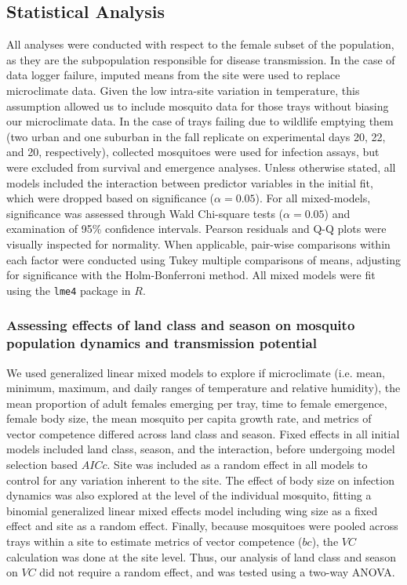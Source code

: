 \documentclass[12pt]{article}
\begin{document}
\subsection{Statistical Analysis}

All analyses were conducted with respect to the female subset of the population, as they are the subpopulation responsible for disease transmission. In the case of data logger failure, imputed means from the site were used to replace microclimate data. Given the low intra-site variation in temperature, this assumption allowed us to include mosquito data for those trays without biasing our microclimate data. In the case of trays failing due to wildlife emptying them (two urban and one suburban in the fall replicate on experimental days 20, 22, and 20, respectively), collected mosquitoes were used for infection assays, but were excluded from survival and emergence analyses. Unless otherwise stated, all models included the interaction between predictor variables in the initial fit, which were dropped based on significance ($\alpha=0.05$). For all mixed-models, significance was assessed through Wald Chi-square tests ($\alpha=0.05$) and examination of 95\% confidence intervals. Pearson residuals and Q-Q plots were visually inspected for normality. When applicable, pair-wise comparisons within each factor were conducted using Tukey multiple comparisons of means, adjusting for significance with the Holm-Bonferroni method. All mixed models were fit using the \texttt{lme4}\citep{lmePackage} package in $R$\citep{Rstats2017}.

\subsubsection{Assessing effects of land class and season on mosquito population dynamics and transmission potential}

We used generalized linear mixed models to explore if microclimate (i.e. mean, minimum, maximum, and daily ranges of temperature and relative humidity), the mean proportion of adult females emerging per tray, time to female emergence, female body size, the mean mosquito per capita growth rate, and metrics of vector competence differed across land class and season. Fixed effects in all initial models included land class, season, and the interaction, before undergoing model selection based $AICc$. Site was included as a random effect in all models to control for any variation inherent to the site. The effect of body size on infection dynamics was also explored at the level of the individual mosquito, fitting a binomial generalized linear mixed effects model including wing size as a fixed effect and site as a random effect.  Finally, because mosquitoes were pooled across trays within a site to estimate metrics of vector competence ($bc$), the $VC$ calculation was done at the site level.  Thus, our analysis of land class and season on  $VC$ did not require a random effect, and was tested using a two-way ANOVA.
\end{document}
